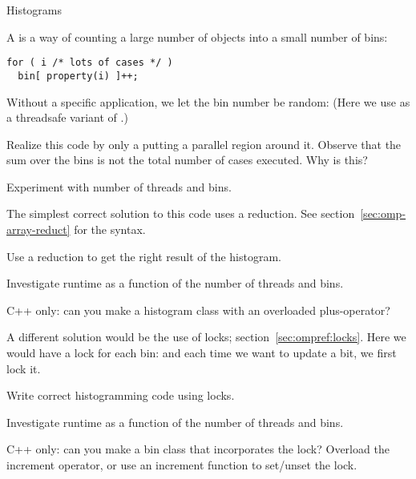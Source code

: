 
 {Histograms}
\label{sec:omp-histogram}

A  is a way of counting a large number of objects
into a small number of bins:
\begin{lstlisting}
for ( i /* lots of cases */ )
  bin[ property(i) ]++;
\end{lstlisting}
Without a specific application, we let the bin number
be random:
(Here we use  as a threadsafe variant of .)

\begin{exercise}
  Realize this code by only a putting a parallel region around it.
  Observe that the sum over the bins is not the total number of
  cases executed. Why is this?

  Experiment with number of threads and bins.
\end{exercise}

The simplest correct solution to this code uses a reduction.
See section~\ref{sec:omp-array-reduct} for the syntax.

\begin{exercise}
  Use a reduction to get the right result of the histogram.

  Investigate runtime as a function of the number of threads and bins.

  C++ only: can you make a histogram class with an overloaded plus-operator?
\end{exercise}

A different solution would be the use of locks; section~\ref{sec:ompref:locks}.
Here we would have a lock for each bin:
and each time we want to update a bit, we first lock it.

\begin{exercise}
  Write correct histogramming code using locks.

  Investigate runtime as a function of the number of threads and bins.

  C++ only: can you make a bin class that incorporates the lock?
  Overload the increment operator, or use an increment function
  to set/unset the lock.
\end{exercise}

